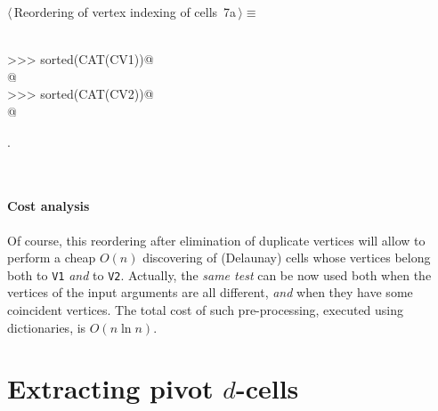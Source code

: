 \documentclass[11pt,oneside]{article}	%
\begin{document}
\begin{flushleft} \small
\begin{minipage}{\linewidth} \label{scrap13}
\protect{}$\langle\,$Reordering of vertex indexing of cells\nobreak\ {\footnotesize 7a}$\,\rangle\equiv$
\vspace{-1ex}
\begin{list}{}{} \item
\mbox{}\verb@@\\
\mbox{}\verb@>>> sorted(CAT(CV1))@\\
\mbox{}\verb@[0, 1, 1, 2, 3, 4, 5, 5]@\\
\mbox{}\verb@>>> sorted(CAT(CV2))@\\
\mbox{}\verb@[3, 4, 5, 6, 7, 7, 8, 8, 9, 10, 11]@\\
\mbox{}\verb@@{\NWsep}
\end{list}
\vspace{-1ex}
\footnotesize\addtolength{\baselineskip}{-1ex}
\begin{list}{}{\setlength{\itemsep}{-\parsep}\setlength{\itemindent}{-\leftmargin}}
\item {\NWtxtMacroNoRef}.
\end{list}
\end{minipage}\\[4ex]
\end{flushleft}
\paragraph{Cost analysis} 
Of course, this reordering after elimination of duplicate vertices will allow to perform a cheap $O(n)$ discovering of (Delaunay) cells whose vertices belong both to \texttt{V1} \emph{and} to \texttt{V2}. 
Actually, the \emph{same test} can be now used both when the vertices of the input arguments are all different, \emph{and} when they have some coincident vertices.
The total cost of such pre-processing, executed using dictionaries, is $O(n\ln n)$.


\section{Extracting pivot $d$-cells}
\end{document}
